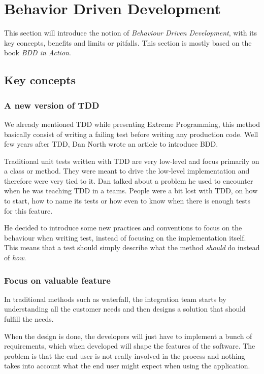 \section{Behavior Driven Development}\label{sec:bdd}

This section will introduce the notion of \textit{Behaviour Driven
Development}, with its key concepts, benefits and limits or pitfalls.
This section is mostly based on the book \textit{BDD in Action}.

\subsection{Key concepts}\label{subsec:bdd-key-concepts}

\subsubsection{A new version of TDD}
We already mentioned TDD while presenting Extreme Programming, this method
basically consist of writing a failing test before writing any production code.
Well few years after TDD, Dan North wrote an article to introduce BDD\@.

Traditional unit tests written with TDD are very low-level and focus
primarily on a class or method.
They were meant to drive the low-level implementation and therefore were very
tied to it.
Dan talked about a problem he used to encounter when he was teaching TDD in
a teams.
People were a bit lost with TDD, on how to start, how to name its tests or how
even to know when there is enough tests for this feature.

He decided to introduce some new practices and conventions to focus on the
behaviour when writing test, instead of focusing on the implementation itself.
This means that a test should simply describe what the method \textit{should}
do instead of \textit{how}.

\subsubsection{Focus on valuable feature}
In traditional methods such as waterfall, the integration team starts by
understanding all the customer needs and then designs a solution that should
fulfill the needs.

When the design is done, the developers will just have to implement a bunch
of requirements, which when developed will shape the features of the software.
The problem is that the end user is not really involved in the process and
nothing takes into account what the end user might expect when using the
application.

